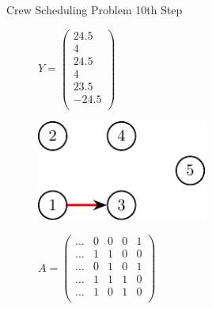\documentclass{beamer}
\begin{document}
\begin{frame}{Crew Scheduling Problem}
    10th Step
    \begin{figure}[!htb]
        \begin{minipage}{0.48\textwidth}
            \centering
            $Y = \begin{pmatrix} 24.5\\ 4\\ 24.5\\ 4\\ 23.5\\ -24.5\\ \end{pmatrix}$
                \begin{center}
                {
                \centering
                \includegraphics[width=0.5\textwidth]{graph5.pdf}
                }
                \end{center}
            \end{minipage}
        \begin{minipage}{0.48\textwidth}
            $A = \begin{pmatrix}
                \ldots & 0 & 0 & 0 & 1 \\
                \ldots & 1 & 1 & 0 & 0 \\
                \ldots & 0 & 1 & 0 & 1 \\
                \ldots & 1 & 1 & 1 & 0 \\
                \ldots & 1 & 0 & 1 & 0 \\
            \end{pmatrix}$
        \end{minipage}
    \end{figure}
\end{frame}
\end{document}

